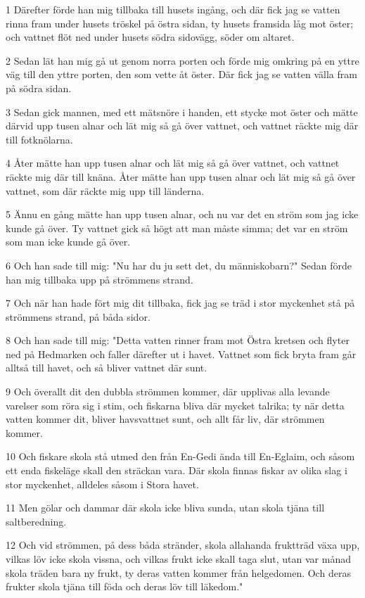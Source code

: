 \par 1 Därefter förde han mig tillbaka till husets ingång, och där fick jag se vatten rinna fram under husets tröskel på östra sidan, ty husets framsida låg mot öster; och vattnet flöt ned under husets södra sidovägg, söder om altaret.
\par 2 Sedan lät han mig gå ut genom norra porten och förde mig omkring på en yttre väg till den yttre porten, den som vette åt öster. Där fick jag se vatten välla fram på södra sidan.
\par 3 Sedan gick mannen, med ett mätsnöre i handen, ett stycke mot öster och mätte därvid upp tusen alnar och lät mig så gå över vattnet, och vattnet räckte mig där till fotknölarna.
\par 4 Åter mätte han upp tusen alnar och lät mig så gå över vattnet, och vattnet räckte mig där till knäna. Åter mätte han upp tusen alnar och lät mig så gå över vattnet, som där räckte mig upp till länderna.
\par 5 Ännu en gång mätte han upp tusen alnar, och nu var det en ström som jag icke kunde gå över. Ty vattnet gick så högt att man måste simma; det var en ström som man icke kunde gå över.
\par 6 Och han sade till mig: "Nu har du ju sett det, du människobarn?" Sedan förde han mig tillbaka upp på strömmens strand.
\par 7 Och när han hade fört mig dit tillbaka, fick jag se träd i stor myckenhet stå på strömmens strand, på båda sidor.
\par 8 Och han sade till mig: "Detta vatten rinner fram mot Östra kretsen och flyter ned på Hedmarken och faller därefter ut i havet. Vattnet som fick bryta fram går alltså till havet, och så bliver vattnet där sunt.
\par 9 Och överallt dit den dubbla strömmen kommer, där upplivas alla levande varelser som röra sig i stim, och fiskarna bliva där mycket talrika; ty när detta vatten kommer dit, bliver havsvattnet sunt, och allt får liv, där strömmen kommer.
\par 10 Och fiskare skola stå utmed den från En-Gedi ända till En-Eglaim, och såsom ett enda fiskeläge skall den sträckan vara. Där skola finnas fiskar av olika slag i stor myckenhet, alldeles såsom i Stora havet.
\par 11 Men gölar och dammar där skola icke bliva sunda, utan skola tjäna till saltberedning.
\par 12 Och vid strömmen, på dess båda stränder, skola allahanda fruktträd växa upp, vilkas löv icke skola vissna, och vilkas frukt icke skall taga slut, utan var månad skola träden bara ny frukt, ty deras vatten kommer från helgedomen. Och deras frukter skola tjäna till föda och deras löv till läkedom."
